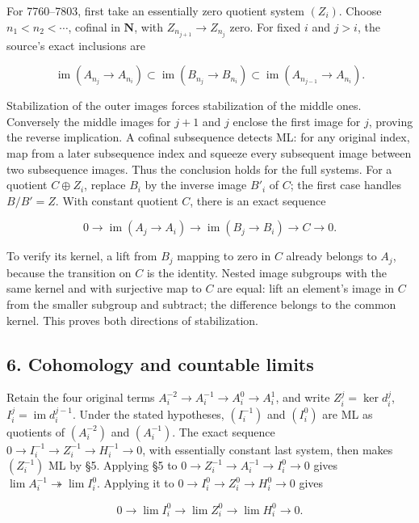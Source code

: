 \documentclass[11pt]{article}
\begin{document}
For 7760--7803, first take an essentially zero quotient system \((Z_i)\). Choose \(n_1<n_2<\cdots\), cofinal in \(\mathbf N\), with \(Z_{n_{j+1}}\to Z_{n_j}\) zero. For fixed \(i\) and \(j>i\), the source's exact inclusions are

\[
\operatorname{im}(A_{n_j}\to A_{n_i})
\subset\operatorname{im}(B_{n_j}\to B_{n_i})
\subset\operatorname{im}(A_{n_{j-1}}\to A_{n_i}).
\]

Stabilization of the outer images forces stabilization of the middle ones. Conversely the middle images for \(j+1\) and \(j\) enclose the first image for \(j\), proving the reverse implication. A cofinal subsequence detects ML: for any original index, map from a later subsequence index and squeeze every subsequent image between two subsequence images. Thus the conclusion holds for the full systems. For a quotient \(C\oplus Z_i\), replace \(B_i\) by the inverse image \(B'_i\) of \(C\); the first case handles \(B/B'=Z\). With constant quotient \(C\), there is an exact sequence

\[
0\to\operatorname{im}(A_j\to A_i)
\to\operatorname{im}(B_j\to B_i)\to C\to0.
\]

To verify its kernel, a lift from \(B_j\) mapping to zero in \(C\) already belongs to \(A_j\), because the transition on \(C\) is the identity. Nested image subgroups with the same kernel and with surjective map to \(C\) are equal: lift an element's image in \(C\) from the smaller subgroup and subtract; the difference belongs to the common kernel. This proves both directions of stabilization.

\subsection{6. Cohomology and countable limits}\label{note-09-cohomology-and-countable-limits}

Retain the four original terms \(A_i^{-2}\to A_i^{-1}\to A_i^0\to A_i^1\), and write \(Z_i^j=\ker d_i^j\), \(I_i^j=\operatorname{im}d_i^{j-1}\). Under the stated hypotheses, \((I_i^{-1})\) and \((I_i^0)\) are ML as quotients of \((A_i^{-2})\) and \((A_i^{-1})\). The exact sequence \(0\to I_i^{-1}\to Z_i^{-1}\to H_i^{-1}\to0\), with essentially constant last system, then makes \((Z_i^{-1})\) ML by §5. Applying §5 to \(0\to Z_i^{-1}\to A_i^{-1}\to I_i^0\to0\) gives \(\lim A_i^{-1}\twoheadrightarrow\lim I_i^0\). Applying it to \(0\to I_i^0\to Z_i^0\to H_i^0\to0\) gives

\[
0\to\lim I_i^0\to\lim Z_i^0\to\lim H_i^0\to0.
\]
\end{document}
